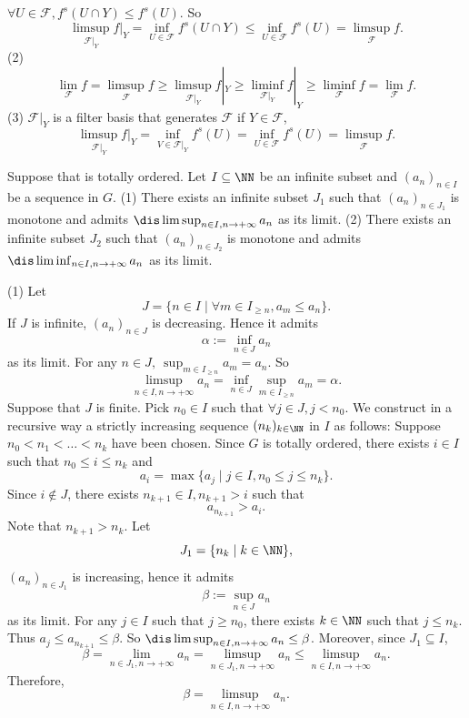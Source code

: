 \begin{proofenv}
    \quad 
    \newline
    $\forall U\in \mathcal{F}, f^s(U\cap Y)\le f^s(U)$. So 
    $$\limsup_{\mathcal{F}|_Y}f|_Y=\inf_{U\in \mathcal{F}}f^s(U\cap Y)\le\inf_{U\in \mathcal{F}}f^s(U)= \limsup_{\mathcal{F}}f.$$
    (2) $$\lim_{\mathcal{F}}f=\limsup_{\mathcal{F}}f\ge\limsup_{\mathcal{F}|_Y}f|_Y\ge \liminf_{\mathcal{F}|_Y}f|_Y\ge \liminf_{\mathcal{F}}f=\lim_{\mathcal{F}}f.$$
    (3) $\mathcal{F}|_Y$ is a filter basis that generates $\mathcal{F}$ if $Y\in \mathcal{F}$,
    $$\limsup_{\mathcal{F}|_Y}f|_Y=\inf_{V\in \mathcal{F}|_Y}f^s(U)=\inf_{U\in \mathcal{F}}f^s(U)=\limsup_{\mathcal{F}}f.$$
\end{proofenv}
\begin{theoremenv}
   Suppose that  is totally ordered. Let $I\subseteq \NN$  be an infinite subset and $(a_n)_{n\in I}$ be a sequence in $G$.
   \newline
   (1) There exists an infinite subset $J_1$ such that $(a_n)_{n\in J_1}$ is monotone and admits $\dis\limsup_{n\in I,n\rightarrow +\infty}a_n$ as its limit.
   \newline
   (2) There exists an infinite subset $J_2$ such that $(a_n)_{n\in J_2}$ is monotone and admits $\dis\liminf_{n\in I,n\rightarrow +\infty}a_n$ as its limit.
    
\end{theoremenv}
\begin{proofenv}
    \quad\newline
    (1) Let 
    $$J=\{n\in I\mid \forall m\in I_{\ge n},a_m\le a_n\}.$$
    If $J$ is infinite, $(a_n)_{n\in J}$ is decreasing. Hence it admits
    $$\alpha:=\inf_{n\in J}a_n$$
    as its limit. For any $n\in J,\ \sup_{m\in I_{\ge n}}a_m=a_n$. So 
    $$\limsup_{n\in I,n\rightarrow+\infty}a_n=\inf_{n\in J}\sup_{m\in I_{\ge n}}a_m=\alpha.$$
    Suppose that $J$ is finite. Pick $n_0\in I $ such that $\forall j\in J,j<n_0$. We construct  in a recursive way a strictly increasing sequence $(n_k)_{k\in \NN}$ in $I$ as follows: Suppose $n_0<n_1<\dots<n_k$ have been chosen. Since $G$ is totally ordered, there exists $i\in I$ such that $n_0\le i\le n_k$ and 
    $$a_i=\max\{a_j\mid j\in I,n_0\le j\le n_k\}.$$
    Since $i\notin J$, there exists $n_{k+1}\in I, n_{k+1}>i$ such that 
    $$a_{n_{k+1}}>a_i.$$
    Note that $n_{k+1}>n_k$. Let 
    $$J_1=\{n_{k}\mid k\in \NN\},$$
    $(a_n)_{n\in J_1}$ is increasing, hence it admits 
    $$\beta:=\sup_{n\in J}a_n$$
    as its limit. For any $j\in I$ such that $j\ge n_0$, there exists $k\in \NN$ such that $j\le n_k$. Thus $a_j\le a_{n_{k+1}}\le \beta$. So $\dis\limsup_{n\in I,n\rightarrow+\infty}a_n\le \beta$. Moreover, since $J_1\subseteq I$, 
    $$\beta=\lim_{n\in J_1,n\rightarrow+\infty}a_n=\limsup_{n\in J_1,n\rightarrow +\infty}a_n\le\limsup_{n\in I,n\rightarrow +\infty}a_n.$$
    Therefore,
    $$\beta=\limsup_{n\in I,n\rightarrow+\infty}a_n.$$
\end{proofenv}




